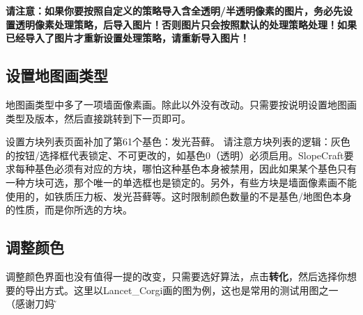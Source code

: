 \documentclass[UTF8]{ctexart}
\begin{document}
    \textbf{请注意：如果你要按照自定义的策略导入含全透明/半透明像素的图片，务必先设置透明像素处理策略，后导入图片！否则图片只会按照默认的处理策略处理！如果已经导入了图片才重新设置处理策略，请重新导入图片！}

    \subsection{设置地图画类型}
    地图画类型中多了一项墙面像素画。除此以外没有改动。只需要按说明设置地图画类型及版本，然后直接跳转到下一页即可。

    设置方块列表页面补加了第61个基色：发光苔藓。
    请注意方块列表的逻辑：灰色的按钮/选择框代表锁定、不可更改的，如基色0（透明）必须启用。SlopeCraft要求每种基色必须有对应的方块，哪怕这种基色本身被禁用，因此如果某个基色只有一种方块可选，那个唯一的单选框也是锁定的。另外，有些方块是墙面像素画不能使用的，如铁质压力板、发光苔藓等。这时限制颜色数量的不是基色/地图色本身的性质，而是你所选的方块。

    \subsection{调整颜色}
    调整颜色界面也没有值得一提的改变，只需要选好算法，点击\textbf{转化}，然后选择你想要的导出方式。这里以Lancet\_Corgi画的图为例，这也是常用的测试用图之一（感谢刀妈\~）

\end{document}
